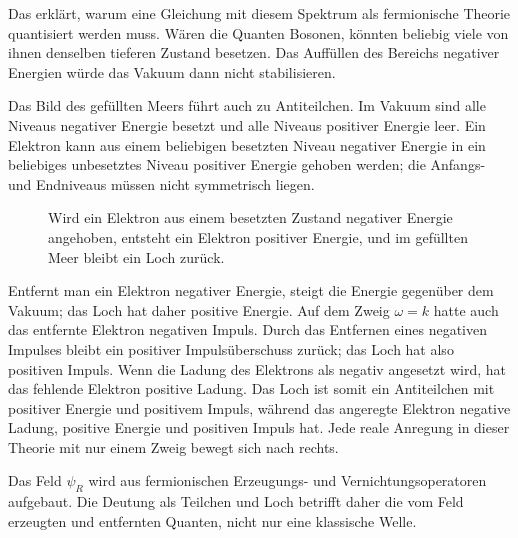 Das erklärt, warum eine Gleichung mit diesem Spektrum als fermionische Theorie quantisiert werden muss. Wären die Quanten Bosonen, könnten beliebig viele von ihnen denselben tieferen Zustand besetzen. Das Auffüllen des Bereichs negativer Energien würde das Vakuum dann nicht stabilisieren.

Das Bild des gefüllten Meers führt auch zu Antiteilchen. Im Vakuum sind alle Niveaus negativer Energie besetzt und alle Niveaus positiver Energie leer. Ein Elektron kann aus einem beliebigen besetzten Niveau negativer Energie in ein beliebiges unbesetztes Niveau positiver Energie gehoben werden; die Anfangs- und Endniveaus müssen nicht symmetrisch liegen.

\begin{figure}[htbp]
\centering
{}
\caption{Wird ein Elektron aus einem besetzten Zustand negativer Energie angehoben, entsteht ein Elektron positiver Energie, und im gefüllten Meer bleibt ein Loch zurück.}
\end{figure}

Entfernt man ein Elektron negativer Energie, steigt die Energie gegenüber dem Vakuum; das Loch hat daher positive Energie. Auf dem Zweig \(\omega=k\) hatte auch das entfernte Elektron negativen Impuls. Durch das Entfernen eines negativen Impulses bleibt ein positiver Impulsüberschuss zurück; das Loch hat also positiven Impuls. Wenn die Ladung des Elektrons als negativ angesetzt wird, hat das fehlende Elektron positive Ladung. Das Loch ist somit ein Antiteilchen mit positiver Energie und positivem Impuls, während das angeregte Elektron negative Ladung, positive Energie und positiven Impuls hat. Jede reale Anregung in dieser Theorie mit nur einem Zweig bewegt sich nach rechts.

Das Feld \(\psi_R\) wird aus fermionischen Erzeugungs- und Vernichtungsoperatoren aufgebaut. Die Deutung als Teilchen und Loch betrifft daher die vom Feld erzeugten und entfernten Quanten, nicht nur eine klassische Welle.

